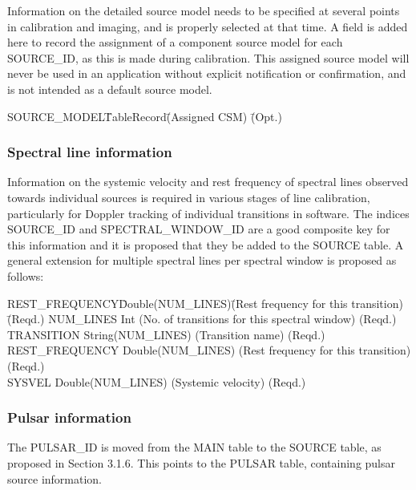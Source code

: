 \documentclass{article}
\begin{document}
Information on the detailed source model needs to be specified at
several points in calibration and imaging, and is properly selected at
that time. A field is added here to record the assignment of a
component source model for each SOURCE\_ID, as this is made during
calibration. This assigned source model will never be used in an
application without explicit notification or confirmation, and is not
intended as a default source model.

\begin{tabbing}
SOURCE\_MODEL\quad\quad \= TableRecord\quad\quad \= 
(Assigned CSM) \quad\quad \= (Opt.) \\
\end{tabbing}

\subsubsection{Spectral line information}

Information on the systemic velocity and rest frequency of spectral
lines observed towards individual sources is required in various
stages of line calibration, particularly for Doppler tracking of
individual transitions in software. The indices SOURCE\_ID and
SPECTRAL\_WINDOW\_ID are a good composite key for this information and
it is proposed that they be added to the SOURCE table. A general
extension for multiple spectral lines per spectral window is proposed
as follows:

\begin{tabbing}
REST\_FREQUENCY\quad\quad \= Double(NUM\_LINES)\quad\quad \=
(Rest frequency for this transition)\quad\quad\quad\quad\quad \= (Reqd.) \kill
NUM\_LINES \> Int \> 
(No. of transitions for this spectral window) \> (Reqd.) \\
TRANSITION           \> String(NUM\_LINES)  \> 
(Transition name) \> (Reqd.) \\
REST\_FREQUENCY       \> Double(NUM\_LINES) \>
(Rest frequency for this transition) \> (Reqd.) \\
SYSVEL               \> Double(NUM\_LINES) \>
(Systemic velocity) \> (Reqd.) \\
\end{tabbing}

\subsubsection{Pulsar information}

 The PULSAR\_ID is moved from the MAIN table to the SOURCE table, as
proposed in Section 3.1.6. This points to the PULSAR table, containing
pulsar source information.
\end{document}
